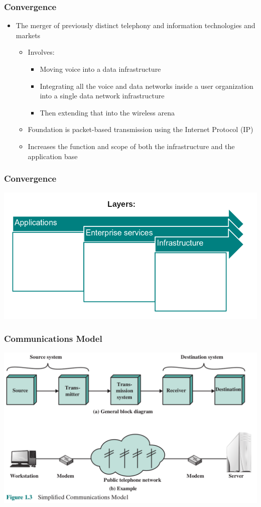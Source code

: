 \documentclass[pdflatex,compress]{beamer}
\begin{document}
\begin{frame}
	\frametitle{Convergence}
	\begin{itemize}
		\item The merger of previously distinct telephony and information technologies and markets
		\begin{itemize}
			\item Involves:
			\begin{itemize}
				\item Moving voice into a data infrastructure
				\item Integrating all the voice and data networks inside a user organization into a single data network infrastructure
				\item Then extending that into the wireless arena
			\end{itemize}
			\item Foundation is packet-based transmission using the Internet Protocol (IP)
			\item Increases the function and scope of both the infrastructure and the application base
		\end{itemize}
	\end{itemize}
\end{frame}

\begin{frame}
	\frametitle{Convergence}
	\begin{center}
		\includegraphics[width=\linewidth]{img/img05}
	\end{center}
\end{frame}

\begin{frame}
	\frametitle{Communications Model}
	\begin{center}
		\includegraphics[width=\linewidth]{img/img06}
	\end{center}
\end{frame}
\end{document}
